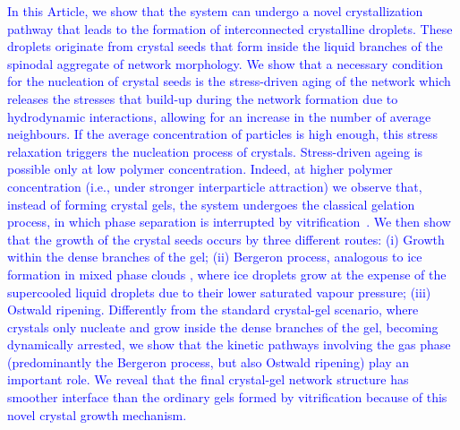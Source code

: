 \documentclass[preprint,amsmath,amssymb,superscriptaddress]{revtex4-1}
\begin{document}
\textcolor{blue}{
In this Article, we show that the system can undergo a novel crystallization pathway that leads to the formation of interconnected crystalline droplets. 
These droplets originate from crystal seeds that form inside the liquid branches of the spinodal aggregate of network morphology.
We show that a necessary condition for the nucleation of crystal seeds is the stress-driven aging of the network which releases the stresses that build-up during the network formation due to hydrodynamic interactions, allowing for an increase in the number of average neighbours. 
If the average concentration of particles is high enough, this stress relaxation triggers the nucleation process of crystals. 
Stress-driven ageing is possible only at low polymer concentration. 
Indeed, at higher polymer concentration (i.e., under stronger interparticle attraction) we observe that, instead of forming crystal gels, the system undergoes the classical gelation process, in which
phase separation is interrupted by vitrification~\cite{verhaegh1997transient,tanaka1999colloid,Royall2007,lu2008gelation}.
We then show that the growth of the crystal seeds occurs by three different routes:
(i) Growth within the dense branches of the gel;
(ii) Bergeron process, analogous to ice formation in mixed phase clouds \cite{glickman2000glossary,morrison2012resilience}, where ice droplets grow at the
expense of the supercooled liquid droplets due to their lower saturated vapour pressure;
(iii) Ostwald ripening.
Differently from the standard crystal-gel scenario, where crystals only nucleate and grow inside the dense branches of the gel, becoming dynamically arrested, we show that the kinetic pathways involving the gas phase (predominantly the Bergeron process, but also Ostwald ripening) play an important role.
We reveal that the final crystal-gel network structure has smoother interface than the ordinary gels formed by vitrification because of this novel crystal growth mechanism.
}
\end{document}
